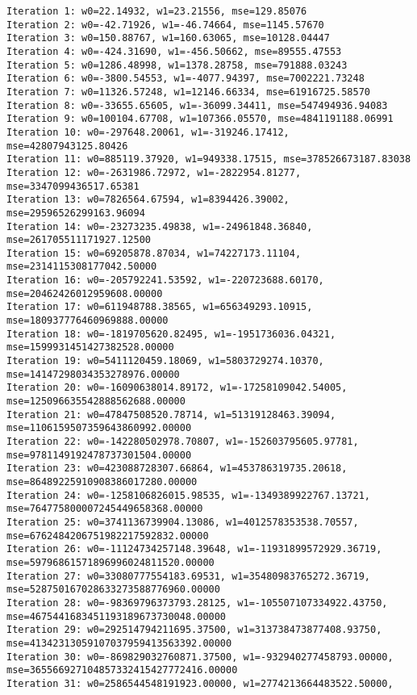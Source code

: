 \documentclass[11pt]{article}
\begin{document}
    \begin{Verbatim}[commandchars=\\\{\}]
Iteration 1: w0=22.14932, w1=23.21556, mse=129.85076
Iteration 2: w0=-42.71926, w1=-46.74664, mse=1145.57670
Iteration 3: w0=150.88767, w1=160.63065, mse=10128.04447
Iteration 4: w0=-424.31690, w1=-456.50662, mse=89555.47553
Iteration 5: w0=1286.48998, w1=1378.28758, mse=791888.03243
Iteration 6: w0=-3800.54553, w1=-4077.94397, mse=7002221.73248
Iteration 7: w0=11326.57248, w1=12146.66334, mse=61916725.58570
Iteration 8: w0=-33655.65605, w1=-36099.34411, mse=547494936.94083
Iteration 9: w0=100104.67708, w1=107366.05570, mse=4841191188.06991
Iteration 10: w0=-297648.20061, w1=-319246.17412, mse=42807943125.80426
Iteration 11: w0=885119.37920, w1=949338.17515, mse=378526673187.83038
Iteration 12: w0=-2631986.72972, w1=-2822954.81277, mse=3347099436517.65381
Iteration 13: w0=7826564.67594, w1=8394426.39002, mse=29596526299163.96094
Iteration 14: w0=-23273235.49838, w1=-24961848.36840, mse=261705511171927.12500
Iteration 15: w0=69205878.87034, w1=74227173.11104, mse=2314115308177042.50000
Iteration 16: w0=-205792241.53592, w1=-220723688.60170,
mse=20462426012959608.00000
Iteration 17: w0=611948788.38565, w1=656349293.10915,
mse=180937776460969888.00000
Iteration 18: w0=-1819705620.82495, w1=-1951736036.04321,
mse=1599931451427382528.00000
Iteration 19: w0=5411120459.18069, w1=5803729274.10370,
mse=14147298034353278976.00000
Iteration 20: w0=-16090638014.89172, w1=-17258109042.54005,
mse=125096635542888562688.00000
Iteration 21: w0=47847508520.78714, w1=51319128463.39094,
mse=1106159507359643860992.00000
Iteration 22: w0=-142280502978.70807, w1=-152603795605.97781,
mse=9781149192478737301504.00000
Iteration 23: w0=423088728307.66864, w1=453786319735.20618,
mse=86489225910908386017280.00000
Iteration 24: w0=-1258106826015.98535, w1=-1349389922767.13721,
mse=764775800007245449658368.00000
Iteration 25: w0=3741136739904.13086, w1=4012578353538.70557,
mse=6762484206751982217592832.00000
Iteration 26: w0=-11124734257148.39648, w1=-11931899572929.36719,
mse=59796861571896996024811520.00000
Iteration 27: w0=33080777554183.69531, w1=35480983765272.36719,
mse=528750167028633273588776960.00000
Iteration 28: w0=-98369796373793.28125, w1=-105507107334922.43750,
mse=4675441683451193189673730048.00000
Iteration 29: w0=292514794211695.37500, w1=313738473877408.93750,
mse=41342313059107037959413563392.00000
Iteration 30: w0=-869829032760871.37500, w1=-932940277458793.00000,
mse=365566927104857332415427772416.00000
Iteration 31: w0=2586544548191923.00000, w1=2774213664483522.50000,

\end{Verbatim}
\end{document}

